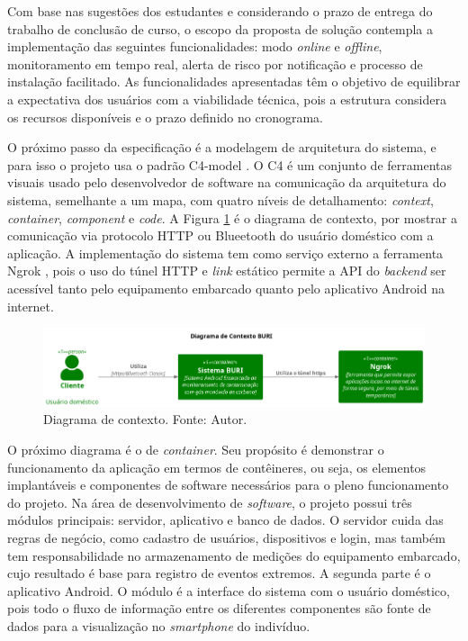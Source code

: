 Com base nas sugestões dos estudantes e considerando o prazo de entrega do trabalho de conclusão de curso, o escopo da proposta de solução contempla a 
implementação das seguintes funcionalidades: modo \textit{online} e \textit{offline}, monitoramento em tempo real, alerta de risco por notificação e processo de instalação facilitado.
As funcionalidades apresentadas têm o objetivo de equilibrar a expectativa dos usuários com a viabilidade técnica, pois a estrutura considera os recursos disponíveis e o prazo definido no 
cronograma.

O próximo passo da especificação é a modelagem de arquitetura do sistema, e para isso o projeto usa o padrão C4-model \cite{c4-model}. O C4 é um conjunto de ferramentas visuais usado pelo 
desenvolvedor de software na comunicação da arquitetura do sistema, semelhante a um mapa, com quatro níveis de detalhamento: \textit{context}, \textit{container}, \textit{component} e \textit{code}. A Figura \ref{figContextDiagram} é o 
diagrama de contexto, por mostrar a comunicação via protocolo HTTP ou Blueetooth do usuário doméstico com a aplicação. A implementação do sistema tem como serviço externo a ferramenta Ngrok \cite{ngrok}, pois o uso do túnel HTTP e \textit{link} estático permite a API do \textit{backend} ser acessível tanto pelo equipamento 
embarcado quanto pelo aplicativo Android na internet.

\begin{figure}[ht]
    \centering
    \includegraphics[width=.87\textwidth]{img/context-diagram.png}
    \caption{Diagrama de contexto. Fonte: Autor.}\label{figContextDiagram}
\end{figure}

O próximo diagrama é o de \textit{container}. Seu propósito é demonstrar o funcionamento da aplicação em termos de contêineres, ou seja, os elementos implantáveis
e componentes de software necessários para o pleno funcionamento do projeto. Na área de desenvolvimento de \textit{software}, o projeto possui três módulos principais: servidor, 
aplicativo e banco de dados. O servidor cuida das regras de negócio, como cadastro de usuários, dispositivos e login, mas também tem responsabilidade no 
armazenamento de medições do equipamento embarcado, cujo resultado é base para registro de eventos extremos. A segunda parte é o aplicativo Android. O módulo é a interface do sistema com o usuário doméstico, pois todo o fluxo de informação entre os 
diferentes componentes são fonte de dados para a visualização no \textit{smartphone} do indivíduo.


